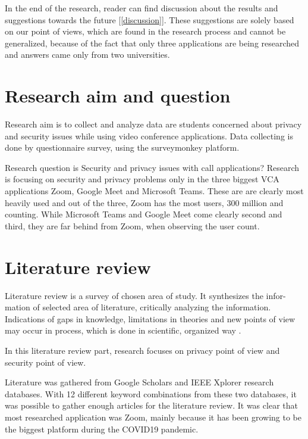 \documentclass[utf8,english]{gradu3}
\begin{document}
%
In the end of the research, reader can find discussion about the results and suggestions towards the future [\ref{discussion}]. These suggestions are solely based on our point of views, which are found in the research process and cannot be generalized, because of the fact that only three applications are being researched and answers came only from two universities.


\chapter{Research aim and question}
\label{researchquestion}
Research aim is to collect and analyze data are students concerned about privacy and security issues while using video conference applications. Data collecting is done by questionnaire survey, using the surveymonkey platform.

Research question is Security and privacy issues with call applications?
Research is focusing on security and privacy problems only in the three biggest VCA applications Zoom, Google Meet and Microsoft Teams. These are are clearly most heavily used and out of the three, Zoom has the most users, 300 million and counting. While Microsoft Teams and Google Meet come clearly second and third, they are far behind from Zoom, when observing the user count.


\chapter{Literature review}
\label{literatureReview}
Literature review is a survey of chosen area of study. It synthesizes the infor-
mation of selected area of literature, critically analyzing the information. Indications of gaps in knowledge, limitations in theories and new points of view may occur in process, which is done in scientific, organized way \parencite{literatureRoyal}.

In this literature review part, research focuses on privacy point of view and security point of view.

Literature was gathered from Google Scholars and IEEE Xplorer research databases. With 12 different keyword combinations from these two databases, it was possible to gather enough articles for the literature review. It was clear that most researched application was Zoom, mainly because it has been growing to be the biggest platform during the COVID19 pandemic.
\end{document}
